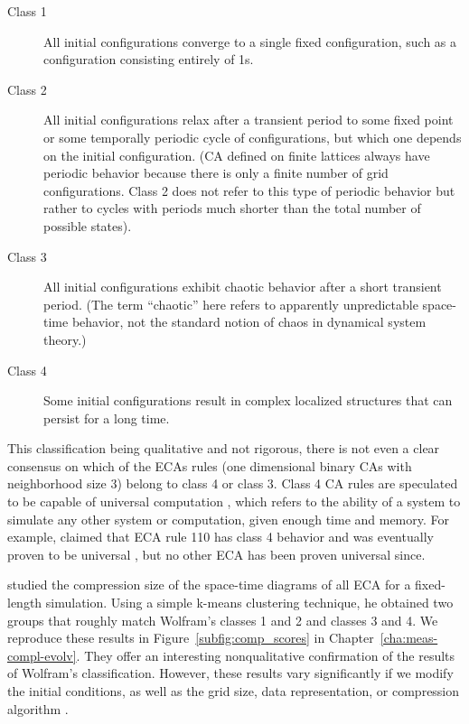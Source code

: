 \begin{description}
  \item[Class 1] All initial configurations converge to a single fixed configuration, such as a configuration consisting entirely of 1s.
  \item[Class 2] All initial configurations relax after a transient period to some
        fixed point or some temporally periodic cycle of configurations, but
        which one depends on the initial configuration. (\ac{CA} defined on
        finite lattices always have periodic behavior because there
        is only a finite number of grid configurations. Class 2 does not refer to
        this type of periodic behavior but rather to cycles with periods much
        shorter than the total number of possible states).
  \item[Class 3] All initial configurations exhibit chaotic behavior
        after a short transient period. (The term “chaotic” here refers to
        apparently unpredictable space-time behavior, not the standard notion 
        of chaos in dynamical system theory.)
  \item[Class 4] Some initial configurations result in complex localized
        structures that can persist for a long time.
\end{description}

This classification being qualitative and not rigorous, there is not even a
clear consensus on which of the \acp{ECA} rules (one dimensional binary \acp{CA} with neighborhood size 3) belong to class 4 or class 3.
Class 4 \ac{CA} rules are speculated to be capable of universal computation
\parencite{wolframUniversalityComplexityCellular1984}, which refers to the ability of a system to simulate any other system or computation, given enough time and memory. For example,
\textcite{liStructureElementaryCellular1990} claimed that \ac{ECA} rule 110 has
class 4 behavior and was eventually proven to be universal
\parencite{cookUniversalityElementaryCellular2004}, but no other \ac{ECA} has
been proven universal since.

\textcite{zenilCompressionBasedInvestigationDynamical2010} studied the
compression size of the space-time diagrams of all \ac{ECA} for a fixed-length
simulation. Using a simple k-means clustering technique, he obtained two groups
that roughly match Wolfram’s classes 1 and 2 and classes 3 and 4. We reproduce
these results in Figure~\ref{subfig:comp_scores} in Chapter~\ref{cha:meas-compl-evolv}.
They offer an interesting
nonqualitative confirmation of the results of Wolfram's classification.
However, these results vary significantly if we modify the initial conditions, as
well as the grid size, data representation, or compression algorithm
\parencite{hudcovaClassificationComplexSystems2020}.


